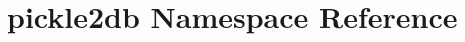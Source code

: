 \hypertarget{namespacepickle2db}{\section{pickle2db Namespace Reference}
\label{namespacepickle2db}
}
